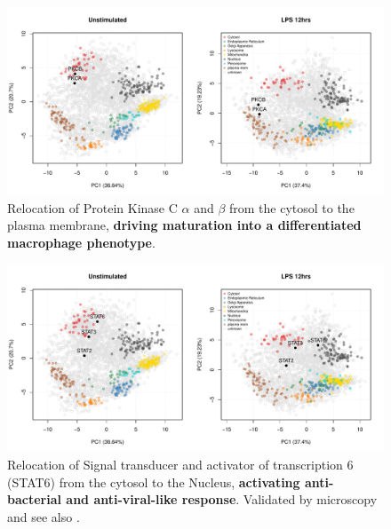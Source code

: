 \begin{frame}
  \begin{figure}[h]
    \centering
    \includegraphics[width=\linewidth]{./figs_local/lps-pkc.pdf}
    \caption{Relocation of Protein Kinase C $\alpha$ and $\beta$ from the
      cytosol to the plasma membrane, \textbf{driving maturation into
        a differentiated macrophage phenotype}.}
  \end{figure}
\end{frame}

\begin{frame}
  \begin{figure}[h]
    \centering
    \includegraphics[width=\linewidth]{./figs_local/lps-stat.pdf}
    \caption{Relocation of Signal transducer and activator of
      transcription 6 (STAT6) from the cytosol to the Nucleus,
      \textbf{activating anti-bacterial and anti-viral-like
        response}. Validated by microscopy and see also
      \cite{Chen:2011}.}
  \end{figure}
\end{frame}
